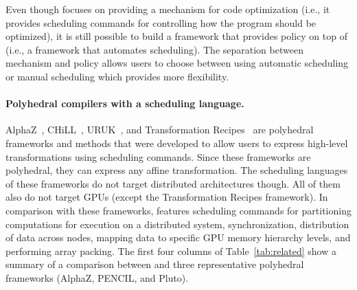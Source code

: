 Even though \framework{} focuses on providing a mechanism for code optimization (i.e., it provides scheduling commands for controlling how the program should be optimized), it is still possible to build a framework that provides policy on top of \framework{} (i.e., a framework that automates scheduling).  The separation between mechanism and policy allows users to choose between using automatic scheduling or manual scheduling which provides more flexibility.

\vspace{-0.5cm}
\paragraph{Polyhedral compilers with a scheduling language.}
AlphaZ~\cite{yuki2012alphaz}, CHiLL~\cite{chill,Hall2010}, URUK~\cite{Girbal2006}, and Transformation Recipes~\cite{Hall:2009:LTR:2155247.2155251} are polyhedral frameworks and methods that were developed to allow users to express high-level transformations using scheduling commands. 
Since these frameworks are polyhedral, they can express any affine transformation.
The scheduling languages of these frameworks do not target distributed architectures though.  All of them also do not target GPUs (except the Transformation Recipes framework).  In comparison with these frameworks, \framework features scheduling commands for partitioning computations for execution on a distributed system, synchronization, distribution of data across nodes, mapping data to specific GPU memory hierarchy levels, and performing array packing.  The first four columns of Table~\ref{tab:related} show a summary of a comparison between \framework{} and three representative polyhedral frameworks (AlphaZ, PENCIL, and Pluto).

